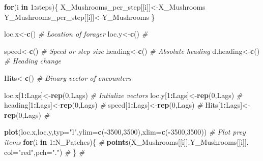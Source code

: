 \documentclass[]{article}
\newenvironment{Shaded}{\begin{snugshade}}{\end{snugshade}}
\newcommand{\KeywordTok}[1]{\textcolor[rgb]{0.13,0.29,0.53}{\textbf{#1}}}
\newcommand{\DataTypeTok}[1]{\textcolor[rgb]{0.13,0.29,0.53}{#1}}
\newcommand{\DecValTok}[1]{\textcolor[rgb]{0.00,0.00,0.81}{#1}}
\newcommand{\StringTok}[1]{\textcolor[rgb]{0.31,0.60,0.02}{#1}}
\newcommand{\CommentTok}[1]{\textcolor[rgb]{0.56,0.35,0.01}{\textit{#1}}}
\newcommand{\ControlFlowTok}[1]{\textcolor[rgb]{0.13,0.29,0.53}{\textbf{#1}}}
\newcommand{\OperatorTok}[1]{\textcolor[rgb]{0.81,0.36,0.00}{\textbf{#1}}}
\newcommand{\NormalTok}[1]{#1}
\begin{document}
\begin{Shaded}
\begin{Highlighting}[]
\ControlFlowTok{for}\NormalTok{(i }\ControlFlowTok{in} \DecValTok{1}\OperatorTok{:}\NormalTok{steps)\{}
\NormalTok{ X_Mushrooms_per_step[[i]]<-X_Mushrooms}
\NormalTok{ Y_Mushrooms_per_step[[i]]<-Y_Mushrooms}
\NormalTok{\}}

\NormalTok{loc.x<-}\KeywordTok{c}\NormalTok{()                                                                      }\CommentTok{# Location of forager}
\NormalTok{loc.y<-}\KeywordTok{c}\NormalTok{()                                                                      }\CommentTok{#}

\NormalTok{speed<-}\KeywordTok{c}\NormalTok{()                                                                      }\CommentTok{# Speed or step size}
\NormalTok{heading<-}\KeywordTok{c}\NormalTok{()                                                                    }\CommentTok{# Absolute heading}
\NormalTok{d.heading<-}\KeywordTok{c}\NormalTok{()                                                                  }\CommentTok{# Heading change}

\NormalTok{Hits<-}\KeywordTok{c}\NormalTok{()                                                                       }\CommentTok{# Binary vector of encounters}

\NormalTok{loc.x[}\DecValTok{1}\OperatorTok{:}\NormalTok{Lags]<-}\KeywordTok{rep}\NormalTok{(}\DecValTok{0}\NormalTok{,Lags)                                                      }\CommentTok{# Intialize vectors}
\NormalTok{loc.y[}\DecValTok{1}\OperatorTok{:}\NormalTok{Lags]<-}\KeywordTok{rep}\NormalTok{(}\DecValTok{0}\NormalTok{,Lags)                                                      }\CommentTok{#}
\NormalTok{heading[}\DecValTok{1}\OperatorTok{:}\NormalTok{Lags]<-}\KeywordTok{rep}\NormalTok{(}\DecValTok{0}\NormalTok{,Lags)                                                    }\CommentTok{#}
\NormalTok{speed[}\DecValTok{1}\OperatorTok{:}\NormalTok{Lags]<-}\KeywordTok{rep}\NormalTok{(}\DecValTok{0}\NormalTok{,Lags)                                                      }\CommentTok{#}
\NormalTok{Hits[}\DecValTok{1}\OperatorTok{:}\NormalTok{Lags]<-}\KeywordTok{rep}\NormalTok{(}\DecValTok{0}\NormalTok{,Lags)                                                       }\CommentTok{#}

\KeywordTok{plot}\NormalTok{(loc.x,loc.y,}\DataTypeTok{typ=}\StringTok{"l"}\NormalTok{,}\DataTypeTok{ylim=}\KeywordTok{c}\NormalTok{(}\OperatorTok{-}\DecValTok{3500}\NormalTok{,}\DecValTok{3500}\NormalTok{),}\DataTypeTok{xlim=}\KeywordTok{c}\NormalTok{(}\OperatorTok{-}\DecValTok{3500}\NormalTok{,}\DecValTok{3500}\NormalTok{))                 }\CommentTok{# Plot prey items}
 \ControlFlowTok{for}\NormalTok{(i }\ControlFlowTok{in} \DecValTok{1}\OperatorTok{:}\NormalTok{N_Patches)\{                                                         }\CommentTok{#}
  \KeywordTok{points}\NormalTok{(X_Mushrooms[[i]],Y_Mushrooms[[i]], }\DataTypeTok{col=}\StringTok{"red"}\NormalTok{,}\DataTypeTok{pch=}\StringTok{"."}\NormalTok{)                  }\CommentTok{#}
\NormalTok{   \}                                                                            }\CommentTok{#}


\end{Highlighting}
\end{Shaded}
\end{document}
